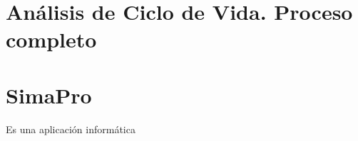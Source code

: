 \section{Análisis de Ciclo de Vida. Proceso completo}

\section{SimaPro}
Es una aplicación informática \cite{mgoedkoop}
